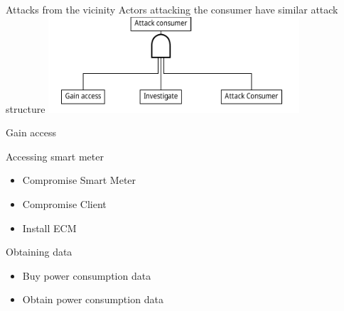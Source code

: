 \begin{frame}{Attacks from the vicinity}
  Actors attacking the consumer have similar attack structure
\center
  \includegraphics[width=0.7\textwidth]{graphics/common_attack.pdf}
\end{frame}

\begin{frame}{Gain access}
  \begin{block}{Accessing smart meter}
    \begin{itemize}
      \item Compromise Smart Meter
      \item Compromise Client
      \item Install ECM
    \end{itemize}
  \end{block}

  \begin{block}{Obtaining data }
    \begin{itemize}
      \item Buy power consumption data
      \item Obtain power consumption data
    \end{itemize}
  \end{block}
\end{frame}

